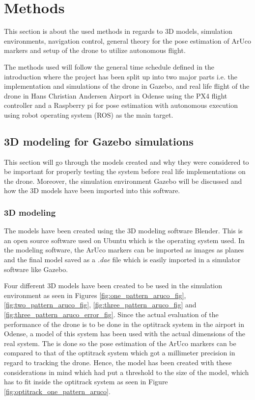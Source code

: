 \documentclass[../Head/report.tex]{subfiles}
\begin{document}
\section{Methods}
\label{sec:methods}

This section is about the used methods in regards to 3D models, simulation environments, navigation control, general theory for the pose estimation of ArUco markers and setup of the drone to utilize autonomous flight.

The methods used will follow the general time schedule defined in the introduction where the project has been split up into two major parts i.e. the implementation and simulations of the drone in Gazebo, and real life flight of the drone in Hans Christian Andersen Airport in Odense using the PX4 flight controller and a Raspberry pi for pose estimation with autonomous execution using robot operating system (ROS) as the main target.

\subsection{3D modeling for Gazebo simulations}

This section will go through the models created and why they were considered to be important for properly testing the system before real life implementations on the drone. Moreover, the simulation environment Gazebo will be discussed and how the 3D models have been imported into this software.     

\label{sec:3d_modeling_for_gazebo_simulations}
\subsubsection{3D modeling}
The models have been created using the 3D modeling software Blender. This is an open source software used on Ubuntu which is the operating system used. In the modeling software, the ArUco markers can be imported as images as planes and the final model saved as a \textit{.dae} file which is easily imported in a simulator software like Gazebo.    

Four different 3D models have been created to be used in the simulation environment as seen in Figures \ref{fig:one_pattern_aruco_fig}, \ref{fig:two_pattern_aruco_fig}, \ref{fig:three_pattern_aruco_fig} and \ref{fig:three_pattern_aruco_error_fig}. Since the actual evaluation of the performance of the drone is to be done in the optitrack system in the airport in Odense, a model of this system has been used with the actual dimensions of the real system. The is done so the pose estimation of the    ArUco markers can be compared to that of the optitrack system which got a millimeter precision in regard to tracking the drone. Hence, the model has been created with these considerations in mind which had put a threshold to the size of the model, which has to fit inside the optitrack system as seen in Figure \ref{fig:optitrack_one_pattern_aruco}. 
\end{document}
